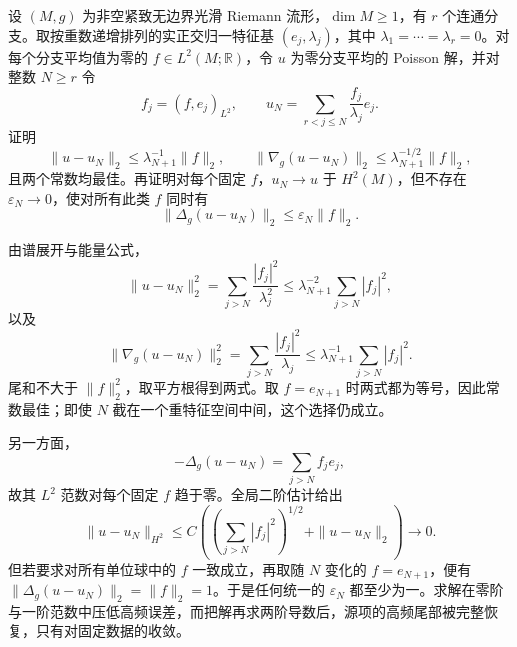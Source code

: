 \begin{exercise}\label{b2:ex:26-spectral-truncation}
设 \((M,g)\) 为非空紧致无边界光滑 Riemann 流形，\(\dim M\geq1\)，有 \(r\) 个连通分支。取按重数递增排列的实正交归一特征基 \((e_j,\lambda_j)\)，其中 \(\lambda_1=\cdots=\lambda_r=0\)。对每个分支平均值为零的 \(f\in L^2(M;\mathbb R)\)，令 \(u\) 为零分支平均的 Poisson 解，并对整数 \(N\geq r\) 令
\[
 f_j=(f,e_j)_{L^2},\qquad u_N=\sum_{r<j\leq N}\frac{f_j}{\lambda_j}e_j.
\]
证明
\[
 \|u-u_N\|_2\leq\lambda_{N+1}^{-1}\|f\|_2,\qquad
 \|\nabla_g(u-u_N)\|_2\leq\lambda_{N+1}^{-1/2}\|f\|_2,
\]
且两个常数均最佳。再证明对每个固定 \(f\)，\(u_N\to u\) 于 \(H^2(M)\)，但不存在 \(\varepsilon_N\to0\)，使对所有此类 \(f\) 同时有
\[
 \|\Delta_g(u-u_N)\|_2\leq\varepsilon_N\|f\|_2.
\]
\end{exercise}
\begin{solution}
由谱展开与能量公式，
\[
 \|u-u_N\|_2^2=\sum_{j>N}\frac{|f_j|^2}{\lambda_j^2}
 \leq\lambda_{N+1}^{-2}\sum_{j>N}|f_j|^2,
\]
以及
\[
 \|\nabla_g(u-u_N)\|_2^2=\sum_{j>N}\frac{|f_j|^2}{\lambda_j}
 \leq\lambda_{N+1}^{-1}\sum_{j>N}|f_j|^2.
\]
尾和不大于 \(\|f\|_2^2\)，取平方根得到两式。取 \(f=e_{N+1}\) 时两式都为等号，因此常数最佳；即使 \(N\) 截在一个重特征空间中间，这个选择仍成立。

另一方面，
\[
 -\Delta_g(u-u_N)=\sum_{j>N}f_je_j,
\]
故其 \(L^2\) 范数对每个固定 \(f\) 趋于零。全局二阶估计给出
\[
 \|u-u_N\|_{H^2}
 \leq C\left(\left(\sum_{j>N}|f_j|^2\right)^{1/2}+\|u-u_N\|_2\right)
 \longrightarrow0.
\]
但若要求对所有单位球中的 \(f\) 一致成立，再取随 \(N\) 变化的 \(f=e_{N+1}\)，便有
\(\|\Delta_g(u-u_N)\|_2=\|f\|_2=1\)。于是任何统一的 \(\varepsilon_N\) 都至少为一。求解在零阶与一阶范数中压低高频误差，而把解再求两阶导数后，源项的高频尾部被完整恢复，只有对固定数据的收敛。
\end{solution}
